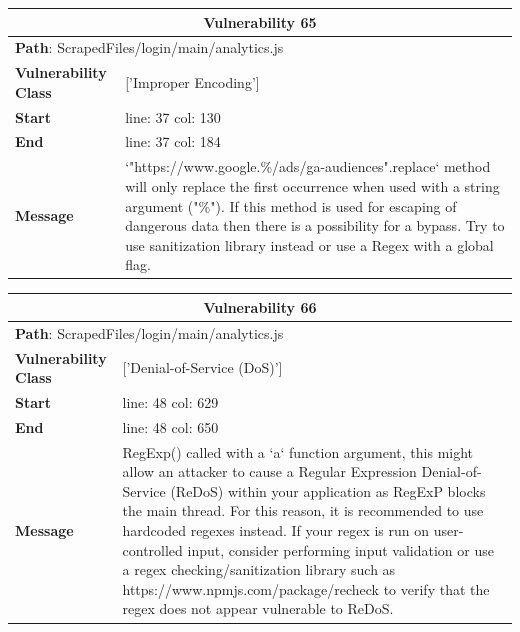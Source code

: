 \documentclass[12pt]{article}
\begin{document}
\vspace{0.7cm}
\FloatBarrier
\begin{table}[!h]
\centering
\renewcommand{\arraystretch}{1.3}
\begin{tabular}{|l|p{10cm}|}
\hline
\multicolumn{2}{|c|}{\textbf{Vulnerability 65}} \\
\hline
\multicolumn{2}{|l|}{\textbf{Path}: ScrapedFiles/login/main/analytics.js} \\
\hline
\textbf{Vulnerability Class} & ['Improper Encoding'] \\
\hline
\textbf{Start} & line: 37 \quad col: 130 \\
\hline
\textbf{End} & line: 37 \quad col: 184 \\
\hline
\textbf{Message} & `"https://www.google.\%/ads/ga-audiences".replace` method will only replace the first occurrence when used with a string argument ("\%"). If this method is used for escaping of dangerous data then there is a possibility for a bypass. Try to use sanitization library instead or use a Regex with a global flag. \\
\hline
\end{tabular}
\end{table}
\vspace{0.7cm}
\FloatBarrier
\begin{table}[!h]
\centering
\renewcommand{\arraystretch}{1.3}
\begin{tabular}{|l|p{10cm}|}
\hline
\multicolumn{2}{|c|}{\textbf{Vulnerability 66}} \\
\hline
\multicolumn{2}{|l|}{\textbf{Path}: ScrapedFiles/login/main/analytics.js} \\
\hline
\textbf{Vulnerability Class} & ['Denial-of-Service (DoS)'] \\
\hline
\textbf{Start} & line: 48 \quad col: 629 \\
\hline
\textbf{End} & line: 48 \quad col: 650 \\
\hline
\textbf{Message} & RegExp() called with a `a` function argument, this might allow an attacker to cause a Regular Expression Denial-of-Service (ReDoS) within your application as RegExP blocks the main thread. For this reason, it is recommended to use hardcoded regexes instead. If your regex is run on user-controlled input, consider performing input validation or use a regex checking/sanitization library such as https://www.npmjs.com/package/recheck to verify that the regex does not appear vulnerable to ReDoS. \\
\hline
\end{tabular}
\end{table}
\end{document}
